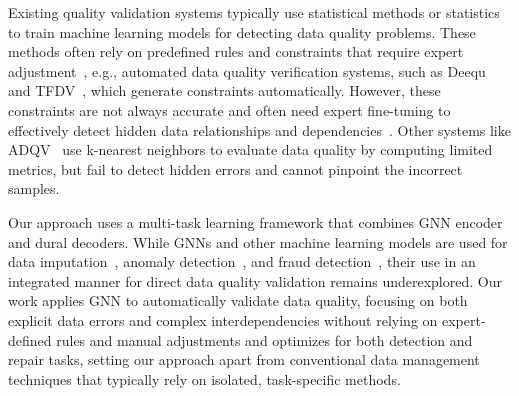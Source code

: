 Existing quality validation systems typically use statistical methods or statistics to train machine learning models for detecting data quality problems. 
These methods often rely on predefined rules and constraints that require expert adjustment~\cite {fadlallah2023context, sinthong2021dqdf}, e.g., automated data quality verification systems, such as Deequ~\cite{schelter2018automating} and TFDV~\cite{caveness2020tensorflow}, which generate constraints automatically. 
However, these constraints are not always accurate and often need expert fine-tuning to effectively detect hidden data relationships and dependencies~\cite{schelter2019differential}. 
Other systems like ADQV~\cite{redyuk2021automating} use k-nearest neighbors to evaluate data quality by computing limited metrics, but fail to detect hidden errors and cannot pinpoint the incorrect samples.


Our approach uses a multi-task learning framework that combines GNN encoder~\cite{li2024graph} and dural decoders. 
While GNNs and other machine learning models are used for data imputation~\cite{telyatnikov2023egg, cappuzzo2024relational, spinelli2020missing}, anomaly detection~\cite{du2022graph}, and fraud detection~\cite{rao2020xfraud, liu2021pick}, their use in an integrated manner for direct data quality validation remains underexplored.
Our work applies GNN to automatically validate data quality, focusing on both explicit data errors and complex interdependencies without relying on expert-defined rules and manual adjustments and optimizes for both detection and repair tasks, setting our approach apart from conventional data management techniques that typically rely on isolated, task-specific methods.




